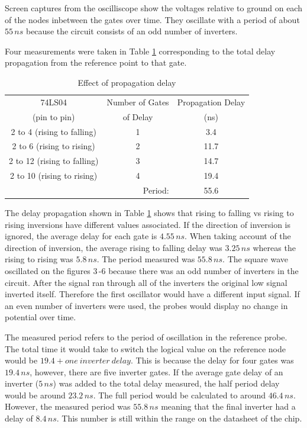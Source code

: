 \documentclass[CMPE]{KGCOEReport}
\begin{document}
Screen captures from the oscilliscope show the voltages relative to ground on each of the nodes inbetween the gates over time. They oscillate with a period of about $55\,ns$ because the circuit consists of an odd number of inverters.\par


Four measurements were taken in Table \ref{tab:INV} corresponding to the total delay propagation from the reference point to that gate.

\begin{table}[h]
\renewcommand{\arraystretch}{1.2}
\caption{Effect of propagation delay}
\begin{center}
\begin{tabular}{|c|c|c|}
\hline

74LS04 & Number of Gates & Propagation Delay \\
(pin to pin) & of Delay & (ns)\\\hline

2 to 4 (rising to falling) & 1 & 3.4\\\hline
2 to 6 (rising to rising) & 2 & 11.7\\\hline
2 to 12 (rising to falling) & 3 & 14.7\\\hline
2 to 10 (rising to rising) & 4 & 19.4\\\hline
\multicolumn{2}{|r|}{Period: } & 55.6  \\\hline

\end{tabular}
\end{center}
\label{tab:INV}
\end{table}

The delay propagation shown in Table \ref{tab:INV} shows that rising to falling vs rising to rising inversions have different values associated. If the direction of inversion is ignored, the average delay for each gate is $4.55\,ns$. When taking account of the direction of inversion, the average rising to falling delay was $3.25\,ns$ whereas the rising to rising was $5.8\,ns$. The period measured was $55.8\,ns$. The square wave oscillated on the figures 3\,-6 because there was an odd number of inverters in the circuit. After the signal ran through all of the inverters the original low signal inverted itself. Therefore the first oscillator would have a different input signal. If an even number of inverters were used, the probes would display no change in potential over time.

The measured period refers to the period of oscillation in the reference probe. The total time it would take to switch the logical value on the reference node would be $19.4 + one\ inverter\ delay$. This is because the delay for four gates was $19.4\,ns$, however, there are five inverter gates. If the average gate delay of an inverter ($5\,ns$) was added to the total delay measured, the half period delay would be around $23.2\,ns$. The full period would be calculated to around $46.4\,ns$. However, the measured period was $55.8\,ns$ meaning that the final inverter had a delay of $8.4\,ns$. This number is still within the range on the datasheet of the chip.
\end{document}
